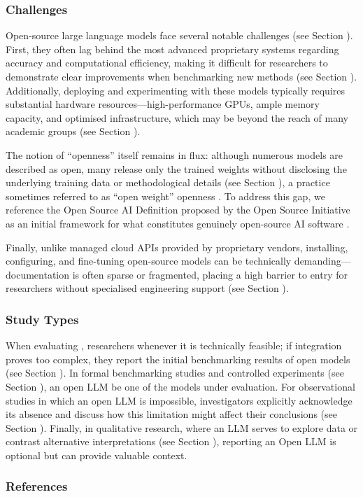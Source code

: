 \subsubsection{Challenges}

Open-source large language models face several notable challenges (see Section \limitationsmitigations). First, they often lag behind the most advanced proprietary systems regarding accuracy and computational efficiency, making it difficult for researchers to demonstrate clear improvements when benchmarking new methods (see Section \benchmarksmetrics). Additionally, deploying and experimenting with these models typically requires substantial hardware resources---high-performance GPUs, ample memory capacity, and optimised infrastructure, which may be beyond the reach of many academic groups (see Section \toolarchitecture). 

The notion of “openness” itself remains in flux: although numerous models are described as open, many release only the trained weights without disclosing the underlying training data or methodological details (see Section \modelversion), a practice sometimes referred to as ``open weight'' openness \cite{Gibney2024}. To address this gap, we reference the Open Source AI Definition proposed by the Open Source Initiative as an initial framework for what constitutes genuinely open-source AI software \cite{OSIAI2024}. 

Finally, unlike managed cloud APIs provided by proprietary vendors, installing, configuring, and fine-tuning open-source models can be technically demanding---documentation is often sparse or fragmented, placing a high barrier to entry for researchers without specialised engineering support (see Section \limitationsmitigations).

\subsubsection{Study Types}

When evaluating \newtools, researchers \should \openllm whenever it is technically feasible; if integration proves too complex, they \must report the initial benchmarking results of open models (see Section \benchmarksmetrics). In formal benchmarking studies and controlled experiments (see Section \benchmarkingtasks), an open LLM \must be one of the models under evaluation. For observational studies in which an open LLM is impossible, investigators \should explicitly acknowledge its absence and discuss how this limitation might affect their conclusions (see Section \limitationsmitigations). Finally, in qualitative research, where an LLM serves to explore data or contrast alternative interpretations (see Section \synthesis), reporting an Open LLM is optional but can provide valuable context.


\subsubsection{References}





